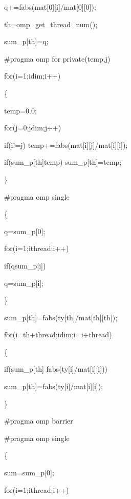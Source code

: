 \documentclass[a4paper]{article}
\begin{document}
{\small \qquad \qquad \qquad \qquad q+=fabs(mat[0][i]/mat[0][0]);}

{\small \qquad \qquad th=omp\_get\_thread\_num();}

{\small \qquad \qquad sum\_p[th]=q;}

{\small \qquad \qquad \#pragma omp for private(temp,j)}

{\small \qquad \qquad for(i=1;i\TEXTsymbol{<}dim;i++)}

{\small \qquad \qquad \{}

{\small \qquad \qquad \qquad temp=0.0;}

{\small \qquad \qquad \qquad for(j=0;j\TEXTsymbol{<}dim;j++)}

{\small \qquad \qquad \qquad \qquad if(i!=j) temp+=fabs(mat[i][j]/mat[i][i]);%
}

{\small \qquad \qquad \qquad if(sum\_p[th]\TEXTsymbol{<}temp)
sum\_p[th]=temp;}

{\small \qquad \qquad \}}

{\small \qquad \qquad \#pragma omp single}

{\small \qquad \qquad \{}

{\small \qquad \qquad \qquad q=sum\_p[0];}

{\small \qquad \qquad \qquad for(i=1;i\TEXTsymbol{<}thread;i++)}

{\small \qquad \qquad \qquad \qquad if(q\TEXTsymbol{<}sum\_p[i])}

{\small \qquad \qquad \qquad \qquad \qquad q=sum\_p[i];}

{\small \qquad \qquad \}}

{\small \qquad \qquad sum\_p[th]=fabs(ty[th]/mat[th][th]);}

{\small \qquad \qquad for(i=th+thread;i\TEXTsymbol{<}dim;i=i+thread)}

{\small \qquad \qquad \{}

{\small \qquad \qquad \qquad if(sum\_p[th]\TEXTsymbol{<}%
fabs(ty[i]/mat[i][i]))}

{\small \qquad \qquad \qquad \qquad \qquad sum\_p[th]=fabs(ty[i]/mat[i][i]);}

{\small \qquad \qquad \}}

{\small \qquad \qquad \#pragma omp barrier}

{\small \qquad \qquad \#pragma omp single}

{\small \qquad \qquad \{}

{\small \qquad \qquad \qquad sum=sum\_p[0];}

{\small \qquad \qquad \qquad for(i=1;i\TEXTsymbol{<}thread;i++) }
\end{document}

